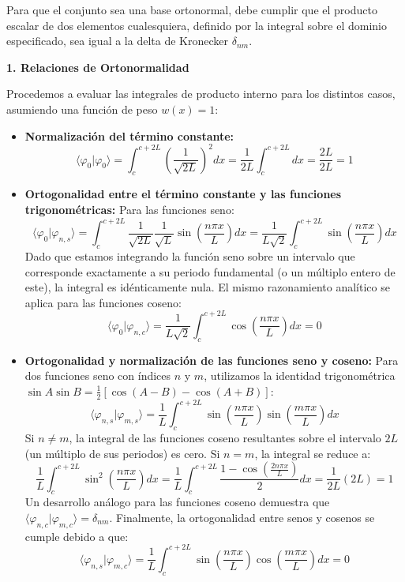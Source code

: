 \documentclass[a4paper]{article}
\begin{document}
Para que el conjunto sea una base ortonormal, debe cumplir que el producto escalar de dos elementos cualesquiera, definido por la integral sobre el dominio especificado, sea igual a la delta de Kronecker $\delta_{nm}$.

\textbf{1. Relaciones de Ortonormalidad}

Procedemos a evaluar las integrales de producto interno para los distintos casos, asumiendo una función de peso $w(x) = 1$:

\begin{itemize}
    \item \textbf{Normalización del término constante:}
    $$ \langle \varphi_0 | \varphi_0 \rangle = \int_{c}^{c+2L} \left( \frac{1}{\sqrt{2L}} \right)^2 dx = \frac{1}{2L} \int_{c}^{c+2L} dx = \frac{2L}{2L} = 1 $$

    \item \textbf{Ortogonalidad entre el término constante y las funciones trigonométricas:}
    Para las funciones seno:
    $$ \langle \varphi_0 | \varphi_{n,s} \rangle = \int_{c}^{c+2L} \frac{1}{\sqrt{2L}} \frac{1}{\sqrt{L}} \sin\left(\frac{n\pi x}{L}\right) dx = \frac{1}{L\sqrt{2}} \int_{c}^{c+2L} \sin\left(\frac{n\pi x}{L}\right) dx $$
    Dado que estamos integrando la función seno sobre un intervalo que corresponde exactamente a su periodo fundamental (o un múltiplo entero de este), la integral es idénticamente nula. El mismo razonamiento analítico se aplica para las funciones coseno:
    $$ \langle \varphi_0 | \varphi_{n,c} \rangle = \frac{1}{L\sqrt{2}} \int_{c}^{c+2L} \cos\left(\frac{n\pi x}{L}\right) dx = 0 $$

    \item \textbf{Ortogonalidad y normalización de las funciones seno y coseno:}
    Para dos funciones seno con índices $n$ y $m$, utilizamos la identidad trigonométrica $\sin A \sin B = \frac{1}{2}[\cos(A-B) - \cos(A+B)]$:
    $$ \langle \varphi_{n,s} | \varphi_{m,s} \rangle = \frac{1}{L} \int_{c}^{c+2L} \sin\left(\frac{n\pi x}{L}\right) \sin\left(\frac{m\pi x}{L}\right) dx $$
    Si $n \neq m$, la integral de las funciones coseno resultantes sobre el intervalo $2L$ (un múltiplo de sus periodos) es cero. Si $n = m$, la integral se reduce a:
    $$ \frac{1}{L} \int_{c}^{c+2L} \sin^2\left(\frac{n\pi x}{L}\right) dx = \frac{1}{L} \int_{c}^{c+2L} \frac{1 - \cos\left(\frac{2n\pi x}{L}\right)}{2} dx = \frac{1}{2L} (2L) = 1 $$
    Un desarrollo análogo para las funciones coseno demuestra que $\langle \varphi_{n,c} | \varphi_{m,c} \rangle = \delta_{nm}$. Finalmente, la ortogonalidad entre senos y cosenos se cumple debido a que:
    $$ \langle \varphi_{n,s} | \varphi_{m,c} \rangle = \frac{1}{L} \int_{c}^{c+2L} \sin\left(\frac{n\pi x}{L}\right) \cos\left(\frac{m\pi x}{L}\right) dx = 0 $$
\end{itemize}
\end{document}
